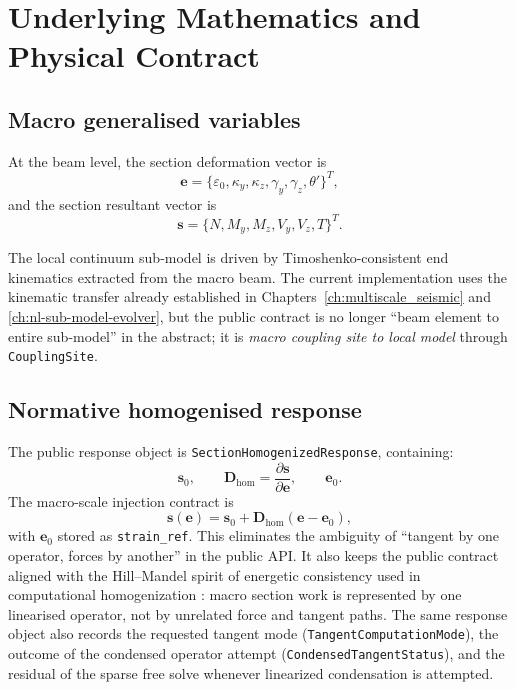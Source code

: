 \section{Underlying Mathematics and Physical Contract}
\label{sec:ms-pub-math}

\subsection{Macro generalised variables}

At the beam level, the section deformation vector is
\begin{equation}
  \mathbf{e}
  =
  \{\varepsilon_0,\kappa_y,\kappa_z,\gamma_y,\gamma_z,\theta'\}^{T},
\end{equation}
and the section resultant vector is
\begin{equation}
  \mathbf{s}
  =
  \{N,M_y,M_z,V_y,V_z,T\}^{T}.
\end{equation}

The local continuum sub-model is driven by Timoshenko-consistent end
kinematics extracted from the macro beam.  The current implementation uses the
kinematic transfer already established in Chapters~\ref{ch:multiscale_seismic}
and \ref{ch:nl-sub-model-evolver}, but the public contract is no longer
``beam element to entire sub-model'' in the abstract; it is
\emph{macro coupling site to local model} through \texttt{CouplingSite}.

\subsection{Normative homogenised response}

The public response object is
\texttt{SectionHomogenizedResponse}, containing:
\begin{equation}
  \mathbf{s}_0, \qquad
  \mathbf{D}_{\mathrm{hom}} = \frac{\partial \mathbf{s}}{\partial \mathbf{e}},
  \qquad
  \mathbf{e}_0.
\end{equation}
The macro-scale injection contract is
\begin{equation}
  \mathbf{s}(\mathbf{e})
  =
  \mathbf{s}_0 + \mathbf{D}_{\mathrm{hom}}(\mathbf{e}-\mathbf{e}_0),
  \label{eq:ms-pub-linearized-response}
\end{equation}
with \(\mathbf{e}_0\) stored as \texttt{strain\_ref}.  This eliminates the
ambiguity of ``tangent by one operator, forces by another'' in the public API.
It also keeps the public contract aligned with the Hill--Mandel spirit of
energetic consistency used in computational homogenization
\cite{Hill1963,Feyel1999,Geers2010}: macro section work is represented by one
linearised operator, not by unrelated force and tangent paths.
The same response object also records the requested tangent mode
(\texttt{TangentComputationMode}), the outcome of the condensed operator
attempt (\texttt{CondensedTangentStatus}), and the residual of the sparse free
solve whenever linearized condensation is attempted.

